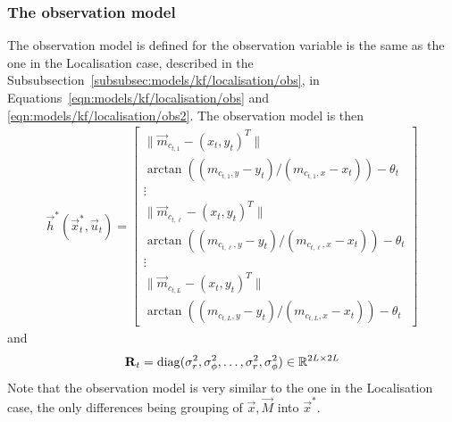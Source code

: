 \subsubsection{The observation model}
The observation model is defined for the observation variable is the same as the one in the Localisation case, described in the Subsubsection~\ref{subsubsec:models/kf/localisation/obs}, in Equations~\eqref{eqn:models/kf/localisation/obs} and \eqref{eqn:models/kf/localisation/obs2}. The observation model is then
\begin{align}
	\vec h^\ast(\vec x^\ast_t, \vec u_t) =
									\begin{bmatrix}
										\|\vec m_{c_{t, 1}} - (x_t, y_t)^T\| \\
										\arctan\left((m_{c_{t, 1}, y} - y_t) / (m_{c_{t, 1}, x} - x_t) \right) - \theta_t \\
										\vdots \\
										\|\vec m_{c_{t, \ell}} - (x_t, y_t)^T\| \\
										\arctan\left((m_{c_{t, \ell}, y} - y_t) / (m_{c_{t, \ell}, x} - x_t) \right) - \theta_t \\
										\vdots \\
										\|\vec m_{c_{t, L}} - (x_t, y_t)^T\| \\
										\arctan\left((m_{c_{t, L}, y} - y_t) / (m_{c_{t, L}, x} - x_t) \right) - \theta_t
									\end{bmatrix}
\end{align}
and
\begin{align}
	\boldsymbol{\mathbf{R}}_t = \operatorname{diag}(\sigma^2_r, \sigma^2_\phi, \dotsc, \sigma^2_r, \sigma^2_\phi) \in \mathbb R^{2L \times 2L}
\end{align}
Note that the observation model is very similar to the one in the Localisation case, the only differences being grouping of $\vec x, \vec M$ into $\vec x^\ast$.